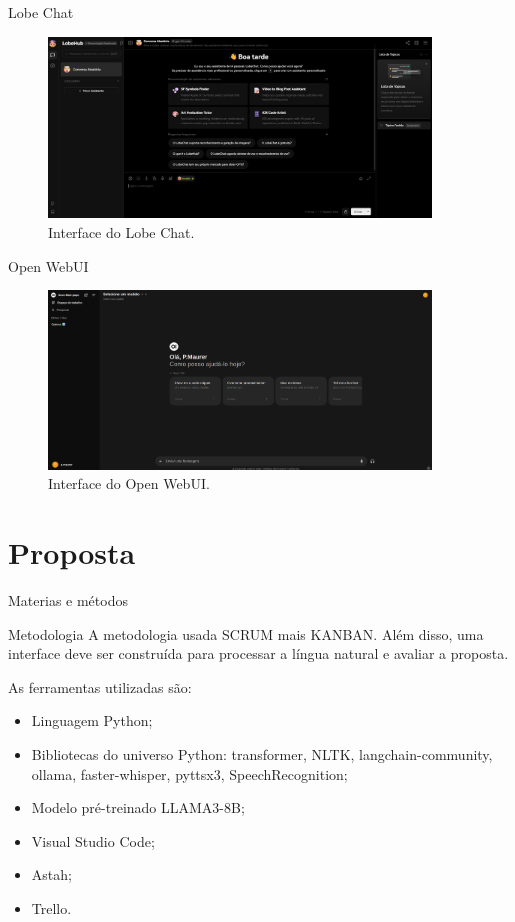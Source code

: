 \documentclass{beamer}
\begin{document}
\begin{frame}{Lobe Chat}
    \begin{figure}[!h]
    \centering
    \includegraphics[width=4.0in]{images/Lobe HUB UI.png}
    \caption{Interface do Lobe Chat.} 
    \label{fig:Lobe Chat}
    \end{figure}
\end{frame}

\begin{frame}{Open WebUI}
    \begin{figure}[!h]
    \centering
    \includegraphics[width=4.0in]{images/OpenWebUi.png}
    \caption{Interface do Open WebUI.} 
    \label{fig:Open WebUI}
    \end{figure}
\end{frame}

\section{Proposta}  
\begin{frame}{Materias e métodos}

\begin{block}{Metodologia}
    A metodologia usada SCRUM mais KANBAN. Além disso,  uma interface deve ser construída para processar a língua natural e avaliar a proposta.    
\end{block}


As ferramentas utilizadas são:
\begin{itemize}
    \item Linguagem Python;
    \item Bibliotecas do universo Python: transformer, NLTK, langchain-community, ollama, faster-whisper, pyttsx3, SpeechRecognition;
    \item Modelo pré-treinado LLAMA3-8B;
    \item Visual Studio Code;
    \item Astah;
    \item Trello.
\end{itemize}
\end{frame}
\end{document}

